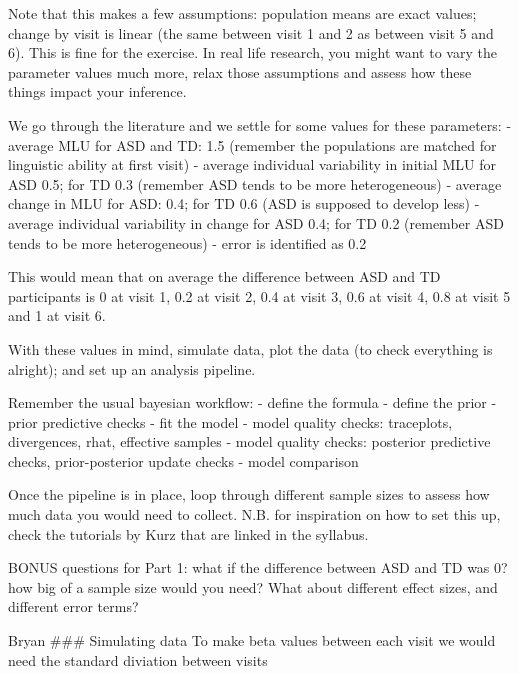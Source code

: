 \documentclass[
]{article}
\begin{document}
Note that this makes a few assumptions: population means are exact
values; change by visit is linear (the same between visit 1 and 2 as
between visit 5 and 6). This is fine for the exercise. In real life
research, you might want to vary the parameter values much more, relax
those assumptions and assess how these things impact your inference.

We go through the literature and we settle for some values for these
parameters: - average MLU for ASD and TD: 1.5 (remember the populations
are matched for linguistic ability at first visit) - average individual
variability in initial MLU for ASD 0.5; for TD 0.3 (remember ASD tends
to be more heterogeneous) - average change in MLU for ASD: 0.4; for TD
0.6 (ASD is supposed to develop less) - average individual variability
in change for ASD 0.4; for TD 0.2 (remember ASD tends to be more
heterogeneous) - error is identified as 0.2

This would mean that on average the difference between ASD and TD
participants is 0 at visit 1, 0.2 at visit 2, 0.4 at visit 3, 0.6 at
visit 4, 0.8 at visit 5 and 1 at visit 6.

With these values in mind, simulate data, plot the data (to check
everything is alright); and set up an analysis pipeline.

Remember the usual bayesian workflow: - define the formula - define the
prior - prior predictive checks - fit the model - model quality checks:
traceplots, divergences, rhat, effective samples - model quality checks:
posterior predictive checks, prior-posterior update checks - model
comparison

Once the pipeline is in place, loop through different sample sizes to
assess how much data you would need to collect. N.B. for inspiration on
how to set this up, check the tutorials by Kurz that are linked in the
syllabus.

BONUS questions for Part 1: what if the difference between ASD and TD
was 0? how big of a sample size would you need? What about different
effect sizes, and different error terms?

Bryan \#\#\# Simulating data To make beta values between each visit we
would need the standard diviation between visits
\end{document}
